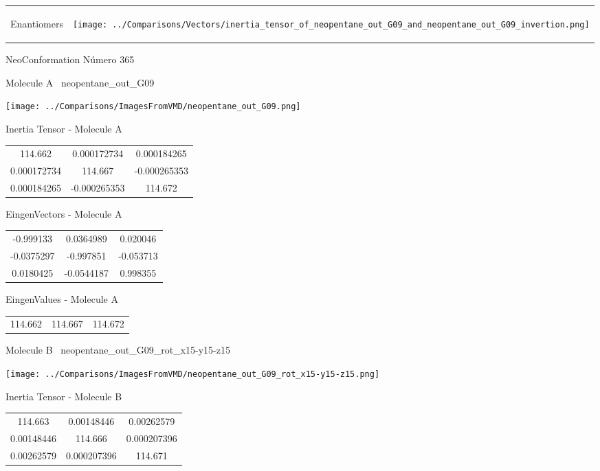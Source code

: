 \vtab[-5mm]
\begin{tabular}{*{2}{m{}}}
\begin{center}
\textcolor{NavyBlue}{\Large Enantiomers}
\end{center}
&
\begin{center}
\texttt{[image: ../Comparisons/Vectors/inertia\_tensor\_of\_neopentane\_out\_G09\_and\_neopentane\_out\_G09\_invertion.png]}
\end{center}
\end{tabular}

 \newpage

\vtab[-3cm]
\begin{center}
{\large NeoConformation \tab Número 365}
\end{center}
\begin{multicols}{2}
\begin{center}

Molecule A \
neopentane\_out\_G09

\texttt{[image: ../Comparisons/ImagesFromVMD/neopentane\_out\_G09.png]}

Inertia Tensor - Molecule A \\
\begin{tabular}{|c c c|}
114.662	 & 	0.000172734	 & 	0.000184265	 \\
0.000172734	 & 	114.667	 & 	-0.000265353	 \\
0.000184265	 & 	-0.000265353	 & 	114.672
\end{tabular}

\vtab
 EingenVectors - Molecule A     \\
\begin{tabular}{|c c c|}
-0.999133	 & 	0.0364989	 & 	0.020046	 \\
-0.0375297	 & 	-0.997851	 & 	-0.053713	 \\
0.0180425	 & 	-0.0544187	 & 	0.998355
\end{tabular}

\vtab
 EingenValues - Molecule A     \\
\begin{tabular}{|c c c|}
114.662	 & 	114.667	 & 	114.672	 \\
\end{tabular}
\columnbreak

Molecule B \
neopentane\_out\_G09\_rot\_x15-y15-z15

\texttt{[image: ../Comparisons/ImagesFromVMD/neopentane\_out\_G09\_rot\_x15-y15-z15.png]}

Inertia Tensor - Molecule B \\
\begin{tabular}{|c c c|}
114.663	 & 	0.00148446	 & 	0.00262579	 \\
0.00148446	 & 	114.666	 & 	0.000207396	 \\
0.00262579	 & 	0.000207396	 & 	114.671
\end{tabular}


\end{center}
\end{multicols}
